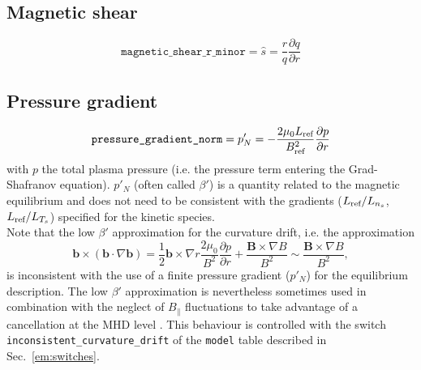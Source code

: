 \documentclass[a4paper]{report}
\begin{document}
\subsection{Magnetic shear} \label{sec:shat}
$$\texttt{magnetic\_shear\_r\_minor}=\hat{s}=\frac{r}{q}\frac{\partial q}{\partial r}$$


\subsection{Pressure gradient} \label{sec:pressure:gradient}
$$\texttt{pressure\_gradient\_norm}=p'_N = -\frac{2\mu_0 L_{\textrm{ref}}}{B_{\textrm{ref}}^2 }\frac{\partial p}{\partial r}$$
with $p$ the total plasma pressure (i.e. the pressure term entering the Grad-Shafranov equation). $p'_N$ (often called $\beta'$) is a quantity related to the magnetic equilibrium and does not need to be consistent with the gradients ($L_{\textrm{ref}}/L_{n_s}$, $L_{\textrm{ref}}/L_{T_s}$) specified for the kinetic species.\\
Note that the low $\beta'$ approximation for the curvature drift, i.e. the approximation
$$\mathbf{b}\times(\mathbf{b}\cdot\nabla\mathbf{b})=\frac{1}{2}\mathbf{b}\times\nabla r\frac{2\mu_0}{B^2}\frac{\partial p}{\partial r} + \frac{\mathbf{B}\times\nabla B}{B^2} \sim  \frac{\mathbf{B}\times\nabla B}{B^2}, $$
is inconsistent with the use of a finite pressure gradient ($p'_N$) for the equilibrium description. 
The low $\beta'$ approximation is nevertheless sometimes used in combination with the neglect of $B_\parallel$ fluctuations to take advantage of a cancellation at the MHD level \cite{Waltz:PoP1999}.
This behaviour is controlled with the switch \texttt{inconsistent\_curvature\_drift} of the \texttt{model} table described in Sec.~\ref{em:switches}.
\end{document}
